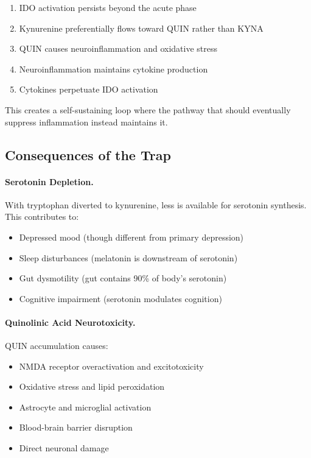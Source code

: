 \begin{enumerate}
    \item IDO activation persists beyond the acute phase
    \item Kynurenine preferentially flows toward QUIN rather than KYNA
    \item QUIN causes neuroinflammation and oxidative stress
    \item Neuroinflammation maintains cytokine production
    \item Cytokines perpetuate IDO activation
\end{enumerate}

This creates a self-sustaining loop where the pathway that should eventually suppress inflammation instead maintains it.

\subsection{Consequences of the Trap}

\paragraph{Serotonin Depletion.} With tryptophan diverted to kynurenine, less is available for serotonin synthesis. This contributes to:
\begin{itemize}
    \item Depressed mood (though different from primary depression)
    \item Sleep disturbances (melatonin is downstream of serotonin)
    \item Gut dysmotility (gut contains 90\% of body's serotonin)
    \item Cognitive impairment (serotonin modulates cognition)
\end{itemize}

\paragraph{Quinolinic Acid Neurotoxicity.} QUIN accumulation causes:
\begin{itemize}
    \item NMDA receptor overactivation and excitotoxicity
    \item Oxidative stress and lipid peroxidation
    \item Astrocyte and microglial activation
    \item Blood-brain barrier disruption
    \item Direct neuronal damage
\end{itemize}

